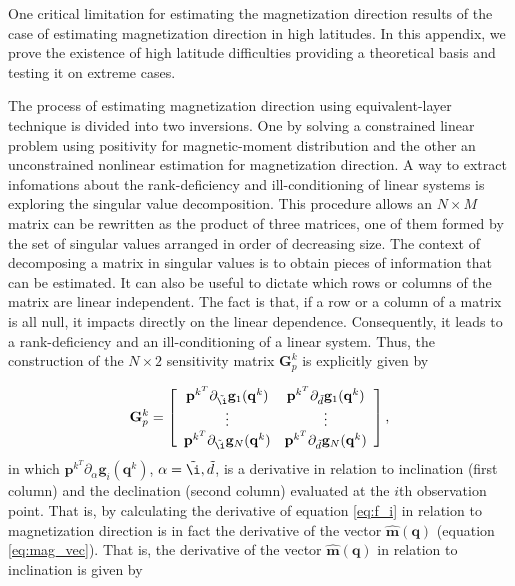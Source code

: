 
One critical limitation for estimating the magnetization direction results of the case of estimating magnetization direction in high latitudes. In this appendix, we prove the existence of high latitude difficulties providing a theoretical basis and testing it on extreme cases.

The process of estimating magnetization direction using equivalent-layer technique is divided into two inversions. One by solving a constrained linear problem using positivity for magnetic-moment distribution and the other an unconstrained nonlinear estimation for magnetization direction. A way to extract infomations about the rank-deficiency and ill-conditioning of linear systems is exploring the singular value decomposition. This procedure allows an $N \times M$ matrix can be rewritten as the product of three matrices, one of them formed by the set of singular values arranged in order of decreasing size. The context of decomposing a matrix in singular values is to obtain pieces of information that can be estimated. It can also be useful to dictate which rows or columns of the matrix are linear independent. The fact is that, if a row or a column of a matrix is all null, it impacts directly on the linear dependence. Consequently, it leads to a rank-deficiency and an ill-conditioning of a linear system. Thus, the construction of the $N \times 2$ sensitivity matrix $\mathbf{G}_{p}^{k}$ is explicitly given by

\begin{equation}
\mathbf{G}_{p}^{k} =
\left[ \begin{array}{cc}
\mathbf{p}^{k^T} \partial_{\tilde{\i}} \mathbf{g}_{1} (\mathbf{q}^k) & \mathbf{p}^{k^T} \partial_{\tilde{d}} \mathbf{g}_{1}(\mathbf{q}^k) \\
\vdots & \vdots  \\
\mathbf{p}^{k^T} \partial_{\tilde{\i}} \mathbf{g}_{N} (\mathbf{q}^k) & \mathbf{p}^{k^T} \partial_{\tilde{d}} \mathbf{g}_{N} (\mathbf{q}^k)
\end{array} \right] ,
\label{eq:gp}
\end{equation}
in which $\mathbf{p}^{k^T} \partial_{\alpha} \mathbf{g}_{i} (\mathbf{q}^k)$, $\alpha =\tilde{\i}, \tilde{d}$, is a derivative in relation to inclination (first column) and the declination (second column) evaluated at the $i$th observation point. That is, by calculating the derivative of equation \ref{eq:f_i} in relation to magnetization direction is in fact the derivative of the vector $\hat{\mathbf{m}}(\mathbf{q})$ (equation \ref{eq:mag_vec}). That is, the derivative of the vector $\hat{\mathbf{m}}(\mathbf{q})$ in relation to inclination is given by

